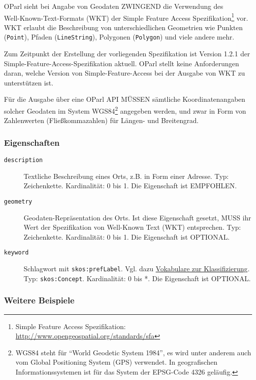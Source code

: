 \documentclass[,a4paper]{article}
\begin{document}
OParl sieht bei Angabe von Geodaten ZWINGEND die Verwendung
des\\Well-Known-Text-Formats (WKT) der Simple Feature Access
Spezifikation\footnote{Simple Feature Access Spezifikation:
  \url{http://www.opengeospatial.org/standards/sfa}} vor. WKT erlaubt
die Beschreibung von unterschiedlichen Geometrien wie Punkten
(\texttt{Point}), Pfaden (\texttt{LineString}), Polygonen
(\texttt{Polygon}) und viele andere mehr.

Zum Zeitpunkt der Erstellung der vorliegenden Spezifikation ist Version
1.2.1 der Simple-Feature-Access-Spezifikation aktuell. OParl stellt
keine Anforderungen daran, welche Version von Simple-Feature-Access bei
der Ausgabe von WKT zu unterstützen ist.

Für die Ausgabe über eine OParl API MÜSSEN sämtliche Koordinatenangaben
solcher Geodaten im System WGS84\footnote{WGS84 steht für ``World
  Geodetic System 1984'', es wird unter anderem auch vom Global
  Positioning System (GPS) verwendet. In geografischen
  Informationssystemen ist für das System der EPSG-Code 4326 geläufig.}
angegeben werden, und zwar in Form von Zahlenwerten (Fließkommazahlen)
für Längen- und Breitengrad.

\subsubsection{Eigenschaften}\label{eigenschaften-9}

\begin{description}
\item[\texttt{description}]
Textliche Beschreibung eines Orts, z.B. in Form einer Adresse. Typ:
Zeichenkette. Kardinalität: 0 bis 1. Die Eigenschaft ist EMPFOHLEN.
\item[\texttt{geometry}]
Geodaten-Repräsentation des Orts. Ist diese Eigenschaft gesetzt, MUSS
ihr Wert der Spezifikation von Well-Known Text (WKT) entsprechen. Typ:
Zeichenkette. Kardinalität: 0 bis 1. Die Eigenschaft ist OPTIONAL.
\item[\texttt{keyword}]
Schlagwort mit \texttt{skos:prefLabel}. Vgl. dazu
\hyperref[vokabulareux5fklassifizierung]{Vokabulare zur
Klassifizierung}. Typ: \texttt{skos:Concept}. Kardinalität: 0 bis *. Die
Eigenschaft ist OPTIONAL.
\end{description}

\subsubsection{Weitere Beispiele}\label{weitere-beispiele}
\end{document}

